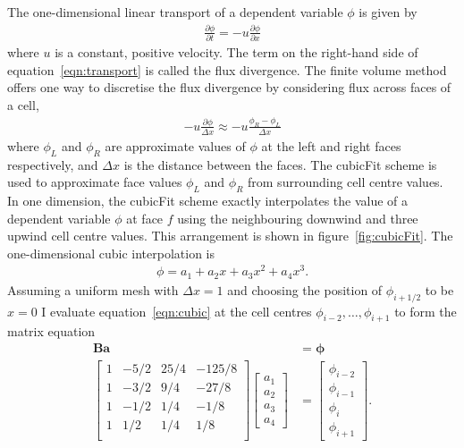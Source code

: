 \documentclass{article}
\begin{document}
The one-dimensional linear transport of a dependent variable $\phi$ is given by
\begin{align}
	\frac{\partial \phi}{\partial t} = - u \frac{\partial \phi}{\partial x} \label{eqn:transport}
\end{align}
where $u$ is a constant, positive velocity.
The term on the right-hand side of equation~\eqref{eqn:transport} is called the flux divergence.
The finite volume method offers one way to discretise the flux divergence by considering flux across faces of a cell,
\begin{align}
	- u \frac{\partial \phi}{\Delta x} \approx - u \frac{\phi_R - \phi_L}{\Delta x} \label{eqn:fluxdiv}
\end{align}
where $\phi_L$ and $\phi_R$ are approximate values of $\phi$ at the left and right faces respectively, and $\Delta x$ is the distance between the faces.  
The cubicFit scheme is used to approximate face values $\phi_L$ and $\phi_R$ from surrounding cell centre values.  In one dimension, the cubicFit scheme exactly interpolates the value of a dependent variable $\phi$ at face $f$ using the neighbouring downwind and three upwind cell centre values.  This arrangement is shown in figure~\ref{fig:cubicFit}.
The one-dimensional cubic interpolation is
\begin{align}
	\phi = a_1 + a_2 x + a_3 x^2 + a_4 x^3 \text{.} \label{eqn:cubic}
\end{align}
Assuming a uniform mesh with $\Delta x = 1$ and choosing the position of $\phi_{i+1/2}$ to be $x=0$ I evaluate equation~\eqref{eqn:cubic} at the cell centres $\phi_{i-2}, \ldots, \phi_{i+1}$ to form the matrix equation
\begin{align}
	\mathbf{B} \mathbf{a} &= \bm{\phi} \\
	\begin{bmatrix}
		1 & -5/2 & 25/4 & -125/8 \\
		1 & -3/2 &  9/4 & -27/8 \\
		1 & -1/2 &  1/4 &  -1/8 \\
		1 &  1/2 &  1/4 &   1/8 \\
	\end{bmatrix}
	\begin{bmatrix}
		a_1 \\
		a_2 \\
		a_3 \\
		a_4
	\end{bmatrix}
	&=
	\begin{bmatrix}
		\phi_{i-2} \\
		\phi_{i-1} \\
		\phi_i \\
		\phi_{i+1}
	\end{bmatrix} \text{.}
\end{align}
\end{document}
